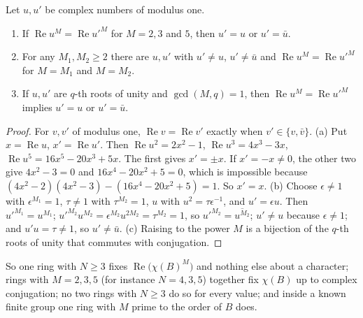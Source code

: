 \begin{proposition}\label{prop:rings}
Let $u,u'$ be complex numbers of modulus one.
\begin{enumerate}[label=(\alph*)]
\item If $\operatorname{Re}u^{M}=\operatorname{Re}u'^{M}$ for $M=2,3$ and $5$, then $u'=u$ or $u'=\bar u$.
\item For any $M_1,M_2\ge2$ there are $u,u'$ with $u'\ne u$, $u'\ne\bar u$ and $\operatorname{Re}u^{M}=\operatorname{Re}u'^{M}$ for $M=M_1$ and $M=M_2$.
\item If $u,u'$ are $q$-th roots of unity and $\gcd(M,q)=1$, then $\operatorname{Re}u^{M}=\operatorname{Re}u'^{M}$ implies $u'=u$ or $u'=\bar u$.
\end{enumerate}
\end{proposition}
\begin{proof}
For $v,v'$ of modulus one, $\operatorname{Re}v=\operatorname{Re}v'$ exactly when $v'\in\{v,\bar v\}$. (a) Put $x=\operatorname{Re}u$, $x'=\operatorname{Re}u'$. Then $\operatorname{Re}u^{2}=2x^{2}-1$, $\operatorname{Re}u^{3}=4x^{3}-3x$, $\operatorname{Re}u^{5}=16x^{5}-20x^{3}+5x$. The first gives $x'=\pm x$. If $x'=-x\ne0$, the other two give $4x^{2}-3=0$ and $16x^{4}-20x^{2}+5=0$, which is impossible because $(4x^{2}-2)(4x^{2}-3)-(16x^{4}-20x^{2}+5)=1$. So $x'=x$. (b) Choose $\epsilon\ne1$ with $\epsilon^{M_1}=1$, $\tau\ne1$ with $\tau^{M_2}=1$, $u$ with $u^{2}=\tau\epsilon^{-1}$, and $u'=\epsilon u$. Then $u'^{M_1}=u^{M_1}$; $u'^{M_2}u^{M_2}=\epsilon^{M_2}u^{2M_2}=\tau^{M_2}=1$, so $u'^{M_2}=\overline{u^{M_2}}$; $u'\ne u$ because $\epsilon\ne1$; and $u'u=\tau\ne1$, so $u'\ne\bar u$. (c) Raising to the power $M$ is a bijection of the $q$-th roots of unity that commutes with conjugation.
\end{proof}

So one ring with $N\ge3$ fixes $\operatorname{Re}\bigl(\chi(B)^{M}\bigr)$ and nothing else about a character; rings with $M=2,3,5$ (for instance $N=4,3,5$) together fix $\chi(B)$ up to complex conjugation; no two rings with $N\ge3$ do so for every value; and inside a known finite group one ring with $M$ prime to the order of $B$ does.

